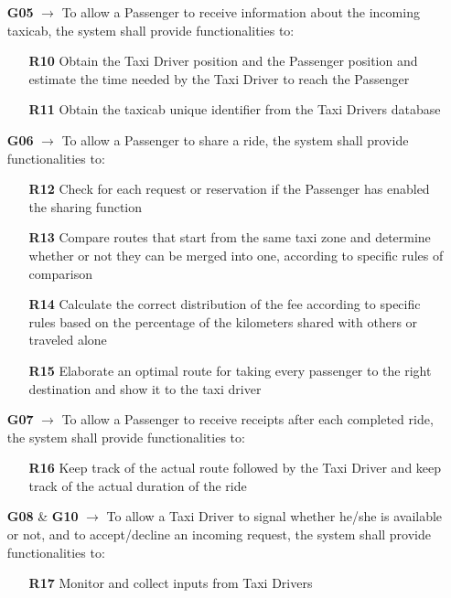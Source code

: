 \begin{itemize}
	\item [\textbf{G05}] $\rightarrow$ To allow a Passenger to receive information about the incoming taxicab, the system shall provide functionalities to:
	\begin{itemize}
		\item [\textbf{R10}] Obtain the Taxi Driver position and the Passenger position and estimate the time needed by the Taxi Driver to reach the Passenger
		\item [\textbf{R11}] Obtain the taxicab unique identifier from the Taxi Drivers database
	\end{itemize}
	
	\item [\textbf{G06}] $\rightarrow$ To allow a Passenger to share a ride, the system shall provide functionalities to:
	\begin{itemize}
		\item [\textbf{R12}] Check for each request or reservation if the Passenger has enabled the sharing function
		\item [\textbf{R13}] Compare routes that start from the same taxi zone and determine whether or not they can be merged into one, according to specific rules of comparison
		\item [\textbf{R14}] Calculate the correct distribution of the fee according to specific rules based on the percentage of the kilometers shared with others or traveled alone
		\item [\textbf{R15}] Elaborate an optimal route for taking every passenger to the right destination and show it to the taxi driver
	\end{itemize}

	\item [\textbf{G07}] $\rightarrow$ To allow a Passenger to receive receipts after each completed ride, the system shall provide functionalities to:
	\begin{itemize}
		\item [\textbf{R16}] Keep track of the actual route followed by the Taxi Driver and keep track of the actual duration of the ride
	\end{itemize}
	
	\item [\textbf{G08}] \& \textbf{G10} $\rightarrow$ To allow a Taxi Driver to signal whether he/she is available or not, and to accept/decline an incoming request, the system shall provide functionalities to:
	\begin{itemize}
		\item [\textbf{R17}] Monitor and collect inputs from Taxi Drivers
	\end{itemize}
	

\end{itemize}
